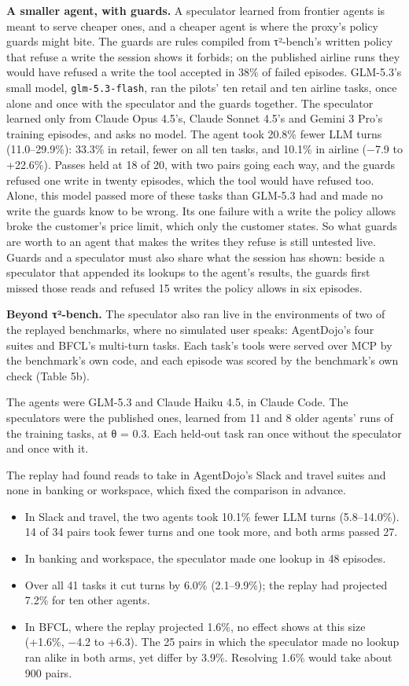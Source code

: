 \documentclass[10pt,twocolumn,letterpaper]{article}
\providecommand{\tightlist}{\setlength{\itemsep}{0pt}\setlength{\parskip}{0pt}}
\newcommand{\runin}[1]{{\sffamily\bfseries\color{accent}#1}}
\begin{document}
\runin{A smaller agent, with guards.} A speculator learned from frontier agents is meant to serve cheaper ones, and a cheaper agent is where the proxy's policy guards might bite. The guards are rules compiled from τ²-bench's written policy that refuse a write the session shows it forbids; on the published airline runs they would have refused a write the tool accepted in 38\% of failed episodes. GLM-5.3's small model, \texttt{glm-5.3-flash}, ran the pilots' ten retail and ten airline tasks, once alone and once with the speculator and the guards together. The speculator learned only from Claude Opus 4.5's, Claude Sonnet 4.5's and Gemini 3 Pro's training episodes, and asks no model. The agent took 20.8\% fewer LLM turns (11.0--29.9\%): 33.3\% in retail, fewer on all ten tasks, and 10.1\% in airline (−7.9 to +22.6\%). Passes held at 18 of 20, with two pairs going each way, and the guards refused one write in twenty episodes, which the tool would have refused too. Alone, this model passed more of these tasks than GLM-5.3 had and made no write the guards know to be wrong. Its one failure with a write the policy allows broke the customer's price limit, which only the customer states. So what guards are worth to an agent that makes the writes they refuse is still untested live. Guards and a speculator must also share what the session has shown: beside a speculator that appended its lookups to the agent's results, the guards first missed those reads and refused 15 writes the policy allows in six episodes.

\runin{Beyond τ²-bench.} The speculator also ran live in the environments of two of the replayed benchmarks, where no simulated user speaks: AgentDojo's four suites and BFCL's multi-turn tasks. Each task's tools were served over MCP by the benchmark's own code, and each episode was scored by the benchmark's own check (Table 5b).

The agents were GLM-5.3 and Claude Haiku 4.5, in Claude Code. The speculators were the published ones, learned from 11 and 8 older agents' runs of the training tasks, at θ = 0.3. Each held-out task ran once without the speculator and once with it.

The replay had found reads to take in AgentDojo's Slack and travel suites and none in banking or workspace, which fixed the comparison in advance.

\begin{itemize}
\tightlist
\item
  In Slack and travel, the two agents took 10.1\% fewer LLM turns (5.8--14.0\%). 14 of 34 pairs took fewer turns and one took more, and both arms passed 27.
\item
  In banking and workspace, the speculator made one lookup in 48 episodes.
\item
  Over all 41 tasks it cut turns by 6.0\% (2.1--9.9\%); the replay had projected 7.2\% for ten other agents.
\item
  In BFCL, where the replay projected 1.6\%, no effect shows at this size (+1.6\%, −4.2 to +6.3). The 25 pairs in which the speculator made no lookup ran alike in both arms, yet differ by 3.9\%. Resolving 1.6\% would take about 900 pairs.
\end{itemize}
\end{document}
